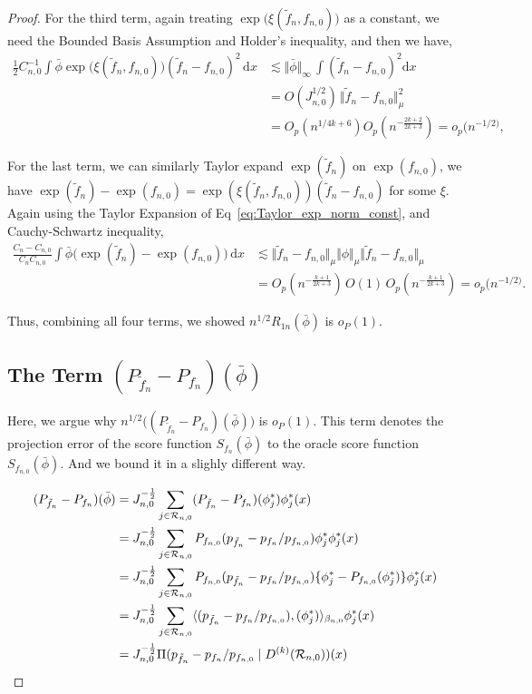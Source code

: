 \begin{proof}
For the third term, again treating $\exp\!\bigl(\xi(\tilde{f}_n,f_{n,0})\bigr)$ as a constant, we need the Bounded Basis Assumption and Holder's inequality, and then we have,
\begin{align*}
\tfrac{1}{2}C_{n,0}^{-1}\int \bar\phi 
             \exp\!\bigl(\xi(\tilde{f}_n,f_{n,0})\bigr)(\tilde{f}_n-f_{n,0})^2\, \mathrm{d}x
&\lesssim \Vert \bar\phi \Vert_{\infty}\, \int (\tilde f_n - f_{n,0})^2 \mathrm{d}x\\
&=  O(J_{n,0}^{1/2})\, \Vert \tilde f_n - f_{n,0} \Vert_{\mu}^{2} \\
&= O_p(n^{1/4k+6}) O_p(n^{-\frac{2k+2}{2k+3}}) = o_p(n^{-1/2)},
\end{align*}

For the last term, we can similarly Taylor expand $\exp(\tilde{f}_n)$ on $\exp(f_{n,0})$, we have $\exp(\tilde{f}_n) - \exp(f_{n,0}) = \exp(\xi(\tilde{f}_n,f_{n,0}))(\tilde{f}_n - f_{n,0})$ for some $\xi$. Again using the Taylor Expansion of Eq~\ref{eq:Taylor_exp_norm_const}, and Cauchy-Schwartz inequality,
\begin{align*}
\frac{C_n-C_{n,0}}{C_n C_{n,0}}
            \int \bar\phi \bigl(\exp(\tilde{f}_n)-\exp(f_{n,0})\bigr)\, \mathrm{d}x &\lesssim \Vert \tilde{f}_n - f_{n,0} \Vert_{\mu}\Vert \phi \Vert_{\mu} \Vert \tilde{f}_n - f_{n,0} \Vert_{\mu}\\
            &= O_p(n^{-\frac{k+1}{2k+3}}) \, O(1) \,O_p(n^{-\frac{k+1}{2k+3}}) = o_p(n^{-1/2)}.
\end{align*}

Thus, combining all four terms, we showed $n^{1/2}R_{1n}(\bar\phi)$ is $o_P(1)$.

\subsection*{The Term $(P_{\tilde f_n} - P_{f_n})(\bar\phi)$}
Here, we argue why $n^{1/2}\bigl((P_{\tilde f_n} - P_{f_n})(\bar\phi)\bigr)$ is $o_P(1)$. This term denotes the projection error of the score function $S_{f_n}(\bar\phi)$ to the oracle score function $S_{f_{n,0}}(\bar\phi)$. And we bound it in a slighly different way.

\begin{align*}
(P_{\tilde f_n} - P_{f_n})(\bar\phi) &= J_{n,0}^{-\frac12}\sum_{j\in {\cal R}_{n,0}} (P_{\tilde f_n} - P_{f_n})(\phi_j^*) \phi_j^*(x)\\
&= J_{n,0}^{-\frac12}\sum_{j\in {\cal R}_{n,0}} P_{f_{n,0}}(p_{\tilde f_n} - p_{f_n}/p_{f_{n,0}}) \phi_j^* \phi_j^*(x)\\
&=J_{n,0}^{-\frac12}\sum_{j\in {\cal R}_{n,0}} P_{f_{n,0}}(p_{\tilde f_n} - p_{f_n}/p_{f_{n,0}}) \{\phi_j^* - P_{f_{n,0}}(\phi_j^*)\} \phi_j^*(x)\\
&=J_{n,0}^{-\frac12}\sum_{j\in {\cal R}_{n,0}} \langle (p_{\tilde f_n} - p_{f_n}/p_{f_{n,0}}), (\phi_j^*) \rangle_{\beta_{n,0}} \phi_j^*(x)\\
&= J_{n,0}^{-\frac12} \Pi(p_{\tilde f_n} - p_{f_n}/p_{f_{n,0}} \mid D^{(k)}(\mathcal{R}_{n,0}))(x)
\end{align*}


\end{proof}
